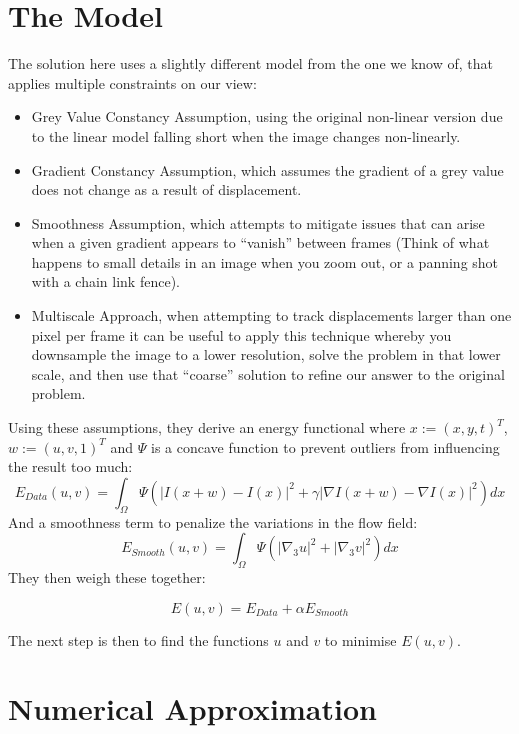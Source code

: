 \documentclass{article}
\begin{document}
\section{The Model}
\label{sc:model}
The solution here uses a slightly different model from the one we know of, that applies multiple constraints on our view:
\begin{itemize}
\item{Grey Value Constancy Assumption, using the original non-linear version due to the linear model falling short when the image changes non-linearly.}
\item{Gradient Constancy Assumption, which assumes the gradient of a grey value does not change as a result of displacement.}
\item{Smoothness Assumption, which attempts to mitigate issues that can arise when a given gradient appears to ``vanish'' between frames (Think of what happens to small details in an image when you zoom out, or a panning shot with a chain link fence).}
\item{Multiscale Approach, when attempting to track displacements larger than one pixel per frame it can be useful to apply this technique whereby you downsample the image to a lower resolution, solve the problem in that lower scale, and then use that ``coarse'' solution to refine our answer to the original problem.}
\end{itemize}

Using these assumptions, they derive an energy functional where $x := (x,y,t)^T$, $w := (u,v,1)^T$ and $\Psi$ is a concave function to prevent outliers from influencing the result too much:
\begin{equation}
  \label{eq:model}
  E_{Data} (u,v) = \int_\Omega \Psi (|I(x+w) - I(x)|^2 + \gamma|\nabla I(x+w) - \nabla I(x)|^2)dx
\end{equation}
And a smoothness term to penalize the variations in the flow field:
\begin{equation}
  \label{eq:smooth}
  E_{Smooth} (u,v) = \int_\Omega \Psi (|\nabla_3u|^2 + |\nabla_3v|^2)dx
\end{equation}
They then weigh these together:

\begin{equation}
  \label{eq:weight}
  E(u,v) = E_{Data} + \alpha E_{Smooth}
\end{equation}

The next step is then to find the functions $u$ and $v$ to minimise $E(u,v)$.

\section{Numerical Approximation}
\label{sc:numapprox}
\end{document}
